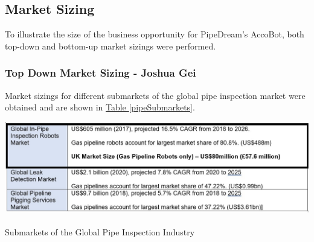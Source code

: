 \documentclass[11pt]{article}		%
\newcommand{\supercite}[1]{\textsuperscript{\cite{#1}}}		%
\newcommand{\tableref}[1]{\hyperref[#1]{Table \ref*{#1}}}     %
\begin{document}
        \subsection[Market Sizing]{Market Sizing}
        To illustrate the size of the business opportunity for PipeDream’s AccoBot, both top-down and bottom-up market sizings were performed.
        
        \subsubsection[Top Down Market Sizing]{Top Down Market Sizing - Joshua Gei} 
        
        Market sizings for different submarkets of the global pipe inspection market were obtained and are shown in \tableref{pipeSubmarkets}. 
    	\begin{table}[h]
			\centering
			\includegraphics[width=\textwidth]{Market Sizing.jpg}
			\caption{Submarkets of the Global Pipe Inspection Industry\supercite{inpipemkt}\supercite{leakmkt}\supercite{pigmkt}}
			\label{pipeSubmarkets}
 		\end{table}
 
\end{document}
